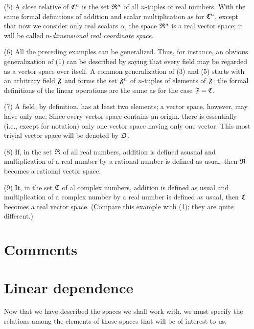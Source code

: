 (5) A close relative of \(\frak{C}^n\) is the set \(\frak{R}^n\) of all \(n\)-tuples of real numbers. With the same formal definitions of addition and scalar multiplication as for \(\frak{C}^n\), except that now we consider only real scalars \(\alpha\), the space \(\frak{R}^n\) is a real vector space; it will be called \(n\)-\emph{dimensional real coordinate space.}

(6) All the preceding examples can be generalized. Thus, for instance, an obvious generalization of (1) can be described by saying that every
field may be regarded as a vector space over itself. A common generalization of (3) and (5) starts with an arbitrary field \(\frak{F}\) and forms the set \(\frak{F}^n\) of \(n\)-tuples of elements of \(\frak{F}\); the formal definitions of the linear operations are the same as for the case \(\frak{F} = \frak{C}\).

(7) A field, by definition, has at least two elements; a vector space, however, may have only one. Since every vector space contains an origin, there is essentially (i.e., except for notation) only one vector space having only one vector. This most trivial vector space will be denoted by \(\frak{O}\).

(8) If, in the set \(\frak{R}\) of all real numbers, addition is defined asusual and multiplication of a real number by a rational number is defined as usual, then \(\frak{R}\) becomes a rational vector space.

(9) It, in the set \(\frak{C}\) of al complex numbers, addition is defined as usual and multiplication of a complex number by a real number is defined as usual, then \(\frak{C}\) becomes a real vector space. (Compare this example with (1); they are quite different.)

\section{Comments}

\section{Linear dependence}

Now that we have described the spaces we shall work with, we must specify the
relations among the elements of those spaces that will be of interest to us.

